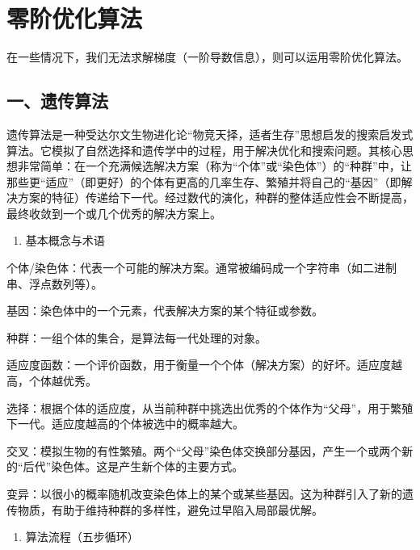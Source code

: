 \setcounter{section}{6}

\hypertarget{ux96f6ux9636ux4f18ux5316ux7b97ux6cd5}{%
\section{零阶优化算法}\label{ux96f6ux9636ux4f18ux5316ux7b97ux6cd5}}

在一些情况下，我们无法求解梯度（一阶导数信息），则可以运用零阶优化算法。

\hypertarget{ux4e00ux9057ux4f20ux7b97ux6cd5}{%
\subsection{一、遗传算法}\label{ux4e00ux9057ux4f20ux7b97ux6cd5}}

遗传算法是一种受达尔文生物进化论``物竞天择，适者生存''思想启发的搜索启发式算法。它模拟了自然选择和遗传学中的过程，用于解决优化和搜索问题。其核心思想非常简单：在一个充满候选解决方案（称为``个体''或``染色体''）的``种群''中，让那些更``适应''（即更好）的个体有更高的几率生存、繁殖并将自己的``基因''（即解决方案的特征）传递给下一代。经过数代的演化，种群的整体适应性会不断提高，最终收敛到一个或几个优秀的解决方案上。

\begin{enumerate}
\def\labelenumi{\arabic{enumi}.}
\tightlist
\item
  基本概念与术语
\end{enumerate}

个体/染色体：代表一个可能的解决方案。通常被编码成一个字符串（如二进制串、浮点数列等）。

基因：染色体中的一个元素，代表解决方案的某个特征或参数。

种群：一组个体的集合，是算法每一代处理的对象。

适应度函数：一个评价函数，用于衡量一个个体（解决方案）的好坏。适应度越高，个体越优秀。

选择：根据个体的适应度，从当前种群中挑选出优秀的个体作为``父母''，用于繁殖下一代。适应度越高的个体被选中的概率越大。

交叉：模拟生物的有性繁殖。两个``父母''染色体交换部分基因，产生一个或两个新的``后代''染色体。这是产生新个体的主要方式。

变异：以很小的概率随机改变染色体上的某个或某些基因。这为种群引入了新的遗传物质，有助于维持种群的多样性，避免过早陷入局部最优解。

\begin{enumerate}
\def\labelenumi{\arabic{enumi}.}
\setcounter{enumi}{1}
\tightlist
\item
  算法流程（五步循环）
\end{enumerate}

